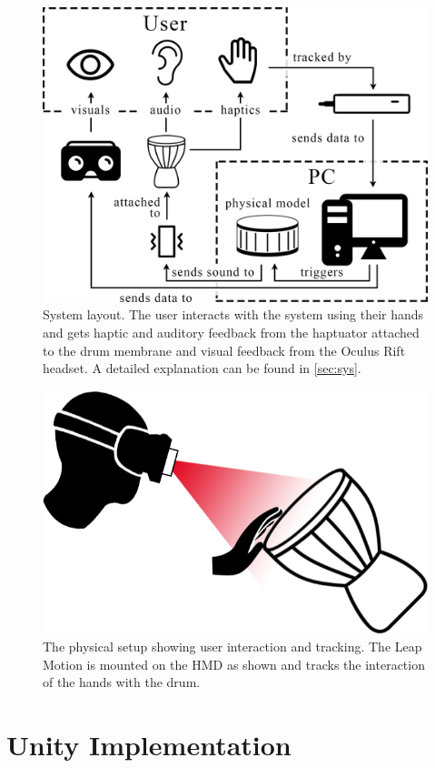 \documentclass{vgtc}
\begin{document}
\begin{figure}[h]
\includegraphics[width=1.0\columnwidth]{systemlayout-reverse.png}
\caption{System layout. The user interacts with the system using their hands and gets haptic and auditory feedback from the haptuator attached to the drum membrane and visual feedback from the Oculus Rift headset. A detailed explanation can be found in \autoref{sec:sys}.}
\centering
\label{fig:systemLayout}
\end{figure}

\begin{figure}[h]
\centering
\includegraphics[width=0.7\columnwidth]{leapOnFace.png}
\caption{The physical setup showing user interaction and tracking. The Leap Motion is mounted on the HMD as shown and tracks the interaction of the hands with the drum.}
\centering
\label{fig:userInt}
\end{figure}

\section{Unity Implementation}\label{sec:unity}
\end{document}
